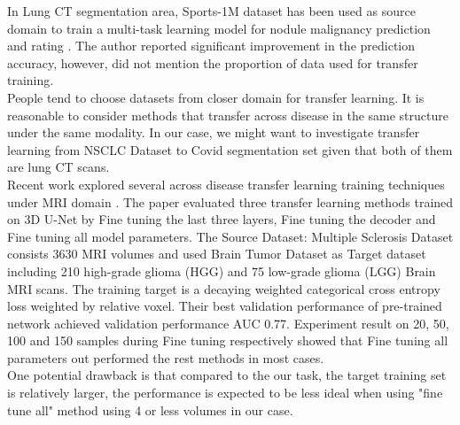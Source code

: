 
In Lung CT segmentation area, Sports-1M dataset has been used as source domain to train a multi-task learning model for nodule malignancy prediction and rating \cite{hussein_risk_2017}. The author reported significant improvement in the prediction accuracy, however, did not mention the proportion of data used for transfer training.\\

People tend to choose datasets from closer domain for transfer learning. It is reasonable to consider methods that transfer across disease in the same structure under the same modality. In our case, we might want to investigate transfer learning from NSCLC Dataset to Covid segmentation set given that both of them are lung CT scans.\\

Recent work explored several across disease transfer learning training techniques under MRI domain \cite{wang_improving_2019}. The paper evaluated three transfer learning methods trained on 3D U-Net by Fine tuning the last three layers, Fine tuning the decoder and Fine tuning all model parameters. 
The Source Dataset: Multiple Sclerosis Dataset consists 3630 MRI volumes and used Brain Tumor Dataset as Target dataset including 210 high-grade glioma (HGG) and 75 low-grade glioma (LGG) Brain MRI scans. The training target is a decaying weighted categorical cross entropy loss weighted by relative voxel. Their best validation performance of pre-trained network achieved validation performance AUC 0.77. Experiment result on 20, 50, 100 and 150 samples during Fine tuning respectively showed that Fine tuning all parameters out performed the rest methods in most cases.\\

One potential drawback is that compared to the our task, the target training set is relatively larger, the performance is expected to be less ideal when using "fine tune all" method using 4 or less volumes in our case.

